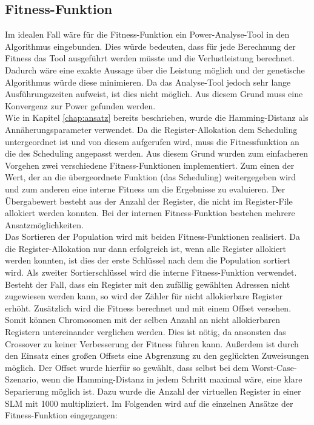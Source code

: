 \subsection{Fitness-Funktion}
\label{chap:Fitness-Funktion}
Im idealen Fall wäre für die Fitness-Funktion ein Power-Analyse-Tool in den Algorithmus eingebunden. Dies würde bedeuten, dass für jede Berechnung der Fitness das Tool ausgeführt werden müsste und die Verlustleistung berechnet. Dadurch wäre eine exakte Aussage über die Leistung möglich und der genetische Algorithmus würde diese minimieren. Da das Analyse-Tool jedoch sehr lange Ausführungszeiten aufweist, ist dies nicht möglich. Aus diesem Grund muss eine Konvergenz zur Power gefunden werden.\\
Wie in Kapitel \ref{chap:ansatz} bereits beschrieben, wurde die Hamming-Distanz als Annäherungsparameter verwendet. Da die Register-Allokation dem Scheduling untergeordnet ist und von diesem aufgerufen wird, muss die Fitnessfunktion an die des Scheduling angepasst werden. Aus diesem Grund wurden zum einfacheren Vorgehen zwei verschiedene Fitness-Funktionen implementiert. Zum einen der Wert, der an die übergeordnete Funktion (das Scheduling) weitergegeben wird und zum anderen eine interne Fitness um die Ergebnisse zu evaluieren.
Der Übergabewert besteht aus der Anzahl der Register, die nicht im Register-File allokiert werden konnten. Bei der internen Fitness-Funktion bestehen mehrere Ansatzmöglichkeiten.\\
Das Sortieren der Population wird mit beiden Fitness-Funktionen realisiert. Da die Register-Allokation nur dann erfolgreich ist, wenn alle Register allokiert werden konnten, ist dies der erste Schlüssel nach dem die Population sortiert wird. Als zweiter Sortierschlüssel wird die interne Fitness-Funktion verwendet.
Besteht der Fall, dass ein Register mit den zufällig gewählten Adressen nicht zugewiesen werden kann, so wird der Zähler für nicht allokierbare Register erhöht. Zusätzlich wird die Fitness berechnet und mit einem Offset versehen. Somit können Chromosomen mit der selben Anzahl an nicht allokierbaren Registern untereinander verglichen werden. Dies ist nötig, da ansonsten das Crossover zu keiner Verbesserung der Fitness führen kann. Außerdem ist durch den Einsatz eines großen Offsets eine Abgrenzung zu den geglückten Zuweisungen möglich. Der Offset wurde hierfür  so gewählt, dass selbst bei dem Worst-Case-Szenario, wenn die Hamming-Distanz in jedem Schritt maximal wäre, eine klare Separierung möglich ist. Dazu wurde die Anzahl der virtuellen Register in einer SLM mit 1000 multipliziert.
Im Folgenden wird auf die einzelnen Ansätze der Fitness-Funktion eingegangen:

